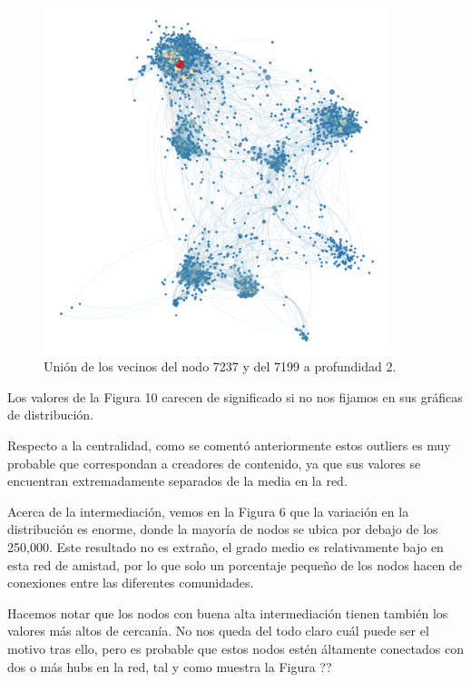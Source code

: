 \begin{figure}[ht]
    \centerfloat
    \includegraphics[width=0.9\textwidth]{img/resultados/grado-vector7199y7237.png}
    \caption{Unión de los vecinos del nodo 7237 y del 7199 a profundidad 2.}
\end{figure}

Los valores de la Figura 10 carecen de significado si no nos fijamos en sus gráficas de distribución.

Respecto a la centralidad, como se comentó anteriormente estos outliers es muy probable que correspondan a creadores de contenido, ya que sus valores se encuentran extremadamente separados de la media en la red.

Acerca de la intermediación, vemos en la Figura 6 que la variación en la distribución es enorme, donde la mayoría de nodos se ubica por debajo de los 250,000. Este resultado no es extraño, el grado medio es relativamente bajo en esta red de amistad, por lo que solo un porcentaje pequeño de los nodos hacen de conexiones entre las diferentes comunidades.

\vspace{\baselineskip}

Hacemos notar que los nodos con buena alta intermediación tienen también los valores más altos de cercanía. No nos queda del todo claro cuál puede ser el motivo tras ello, pero es probable que estos nodos estén áltamente conectados con dos o más hubs en la red, tal y como muestra la  Figura ?? %

